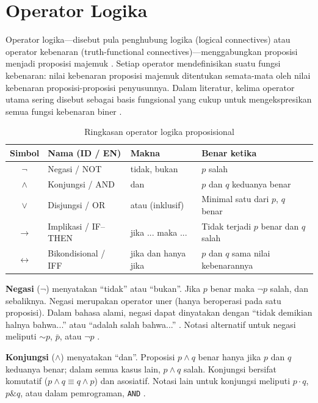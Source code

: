 \section{Operator Logika}

Operator logika---disebut pula penghubung logika (logical connectives) atau operator kebenaran (truth-functional connectives)---menggabungkan proposisi menjadi proposisi majemuk \cite{levin_discrete,rosen2019}. Setiap operator mendefinisikan suatu fungsi kebenaran: nilai kebenaran proposisi majemuk ditentukan semata-mata oleh nilai kebenaran proposisi-proposisi penyusunnya. Dalam literatur, kelima operator utama sering disebut sebagai basis fungsional yang cukup untuk mengekspresikan semua fungsi kebenaran biner \cite{forallx,brilliant_truthtables}.

\begin{table}[htbp]
\centering
\small
\begin{tabular}{|c|l|l|>{\raggedright\arraybackslash}p{4.2cm}|}
\hline
\textbf{Simbol} & \textbf{Nama (ID / EN)} & \textbf{Makna} & \textbf{Benar ketika} \\
\hline
$\neg$ & Negasi / NOT & tidak, bukan & $p$ salah \\
\hline
$\wedge$ & Konjungsi / AND & dan & $p$ dan $q$ keduanya benar \\
\hline
$\vee$ & Disjungsi / OR & atau (inklusif) & Minimal satu dari $p$, $q$ benar \\
\hline
$\rightarrow$ & Implikasi / IF--THEN & jika ... maka ... & Tidak terjadi $p$ benar dan $q$ salah \\
\hline
$\leftrightarrow$ & Bikondisional / IFF & jika dan hanya jika & $p$ dan $q$ sama nilai kebenarannya \\
\hline
\end{tabular}
\caption{Ringkasan operator logika proposisional}
\label{tab:operator-logika}
\end{table}

\textbf{Negasi} ($\neg$) menyatakan ``tidak'' atau ``bukan''. Jika $p$ benar maka $\neg p$ salah, dan sebaliknya. Negasi merupakan operator uner (hanya beroperasi pada satu proposisi). Dalam bahasa alami, negasi dapat dinyatakan dengan ``tidak demikian halnya bahwa...'' atau ``adalah salah bahwa...'' \cite{copi2014}. Notasi alternatif untuk negasi meliputi $\sim p$, $\bar{p}$, atau $\lnot p$ \cite{wiki_proplogic}.

\textbf{Konjungsi} ($\wedge$) menyatakan ``dan''. Proposisi $p \wedge q$ benar hanya jika $p$ dan $q$ keduanya benar; dalam semua kasus lain, $p \wedge q$ salah. Konjungsi bersifat komutatif ($p \wedge q \equiv q \wedge p$) dan asosiatif. Notasi lain untuk konjungsi meliputi $p \cdot q$, $p \mathrel{\&} q$, atau dalam pemrograman, \texttt{AND} \cite{brilliant_truthtables,uw_boolean}.

